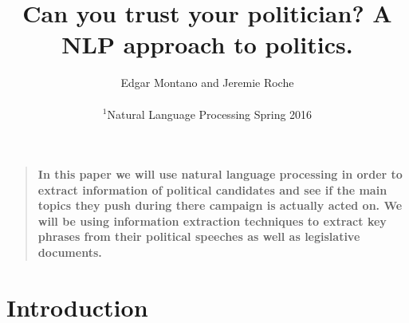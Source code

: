 \documentclass[12pt]{article}
\title{Can you trust your politician? A NLP approach to politics.}
\author
{Edgar Montano and  Jeremie Roche\\
\\
\normalsize{$^{1}$Natural Language Processing Spring 2016}\\
}
\date{}
\newenvironment{sciabstract}{%
\begin{quote} \bf}
{\end{quote}}
\begin{document}
 


\baselineskip24pt


\maketitle 




\begin{sciabstract}
In this paper we will use natural language processing in order to extract information of political candidates and see if the main topics they push during there campaign is actually acted on. We will be using information extraction techniques to extract key phrases from their political speeches as well as legislative documents.
\end{sciabstract}




\section*{Introduction}
\end{document}
